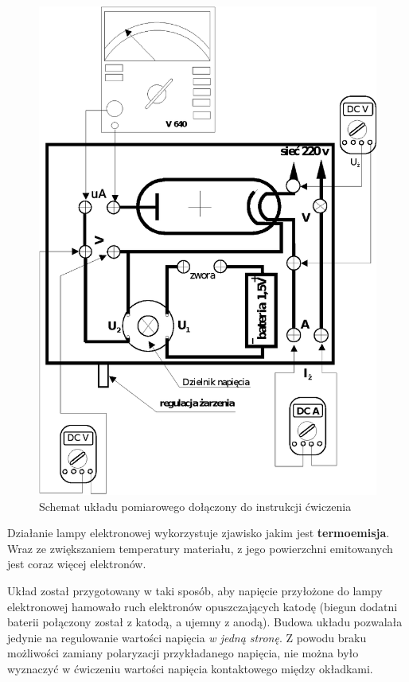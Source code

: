 \documentclass[a4paper]{article}
\newlength{\du}
\begin{document}
\begin{figure}
\centering
\includegraphics[scale=1]{schemat.eps}
\caption{Schemat układu pomiarowego dołączony do instrukcji ćwiczenia}
\label{schemat}
\end{figure}

Działanie lampy elektronowej wykorzystuje zjawisko jakim jest \textbf{termoemisja}.
Wraz ze zwiększaniem temperatury materiału, z jego powierzchni emitowanych jest coraz więcej elektronów.

Układ został przygotowany w taki sposób, aby napięcie przyłożone do lampy elektronowej hamowało
ruch elektronów opuszczających katodę (biegun dodatni baterii połączony został z katodą, a ujemny z anodą).
Budowa układu pozwalała jedynie na regulowanie wartości napięcia \textit{w jedną stronę}.
Z powodu braku możliwości zamiany polaryzacji przykładanego napięcia, nie można było wyznaczyć 
w ćwiczeniu wartości napięcia kontaktowego między okładkami.
\end{document}
